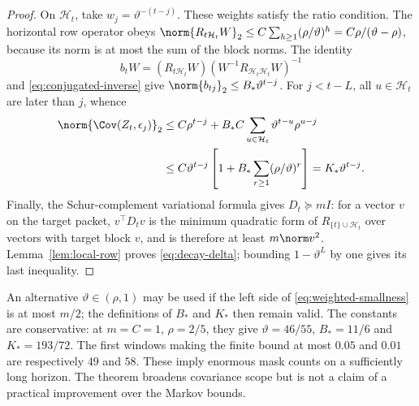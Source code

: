 \begin{proof}
On $\mathcal H_t$, take $w_j=\vartheta^{-(t-j)}$. These weights satisfy
the ratio condition. The horizontal row operator obeys
$\norm{R_{t\mathcal H_t}W}_2
 \le C\sum_{h\ge1}(\rho/\vartheta)^h
 =C\rho/(\vartheta-\rho)$, because its norm is at most the sum of
the block norms. The identity
\[
 b_tW=(R_{t\mathcal H_t}W)
                (W^{-1}R_{\mathcal H_t\mathcal H_t}W)^{-1}
\]
and \eqref{eq:conjugated-inverse} give
$\norm{b_{tj}}_2\le B_*\vartheta^{t-j}$.
For $j<t-L$, all $u\in\mathcal H_t$ are later than $j$, whence
\begin{align*}
 \norm{\Cov(Z_t,\epsilon_j)}_2
 &\le C\rho^{t-j}+B_*C\sum_{u\in\mathcal H_t}
                         \vartheta^{t-u}\rho^{u-j}\\
 &\le C\vartheta^{t-j}
             \left[1+B_*\sum_{r\ge1}(\rho/\vartheta)^r\right]
 =K_*\vartheta^{t-j}.
\end{align*}
Finally, the Schur-complement variational formula gives $D_t\succeq mI$:
for a vector $v$ on the target packet, $v^\top D_tv$ is the minimum
quadratic form of $R_{\{t\}\cup\mathcal H_t}$ over vectors with target
block $v$, and is therefore at least $m\norm v^2$.
Lemma~\ref{lem:local-row} proves \eqref{eq:decay-delta}; bounding
$1-\vartheta^L$ by one gives its last inequality.
\end{proof}

An alternative $\vartheta\in(\rho,1)$ may be used if the left side of
\eqref{eq:weighted-smallness} is at most $m/2$; the definitions of $B_*$
and $K_*$ then remain valid. The constants are conservative: at
$m=C=1$, $\rho=2/5$, they give $\vartheta=46/55$, $B_*=11/6$ and
$K_*=193/72$. The first windows making the finite bound at most $0.05$
and $0.01$ are respectively $49$ and $58$. These imply enormous mask
counts on a sufficiently long horizon. The theorem broadens covariance
scope but is not a claim of a practical improvement over the Markov bounds.

